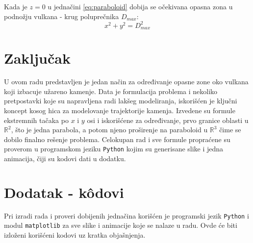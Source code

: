\documentclass[a4paper]{article}
\begin{document}
Kada je $z=0$ u jednačini \ref{eq:paraboloid} dobija se očekivana opasna zona 
u podnožju vulkana - krug poluprečnika
$D_{max}$:
\begin{equation}
x^2 + y^2 = D^2_{max}
\end{equation}


\section{Zaključak}
\label{sec:zakljucak}
U ovom radu predstavljen je jedan način za određivanje opasne zone oko vulkana koji
izbacuje užareno kamenje. Data je formulacija problema i nekoliko pretpostavki koje su 
napravljena radi lakšeg modeliranja, iskorišćen je ključni koncept kosog hica
za modelovanje trajektorije kamenja. Izvedene su formule ekstremnih tačaka 
po $x$ i $y$ osi i iskorišćene za određivanje, prvo granice oblasti u
$\mathbb{R}^2$, što je jedna parabola, a potom njeno proširenje na paraboloid u 
$\mathbb{R}^3$ čime se dobilo finalno rešenje problema. 
Celokupan rad i sve formule propraćene su proverom u programskom jeziku
\verb|Python| kojim su generisane slike i jedna animacija, čiji su kodovi
dati u dodatku.


\appendix
 


\appendix
\section{Dodatak - k\^{o}dovi}
\label{sec:Dodatak}
Pri izradi rada i proveri dobijenih jednačina korišćen je programski jezik 
\verb|Python| i modul \verb|matplotlib|
za sve slike i animacije koje se nalaze u radu. 
Ovde će biti izloženi korišćeni kodovi uz kratka objašnjenja.
\end{document}
